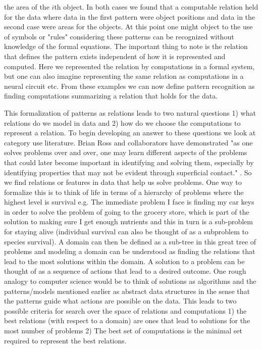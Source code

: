 \documentclass[doc]{apa}%
\begin{document}
the area of the $i$th object.  In both cases we found that a computable
relation held for the data where data in the first pattern were object
positions and data in the second case were areas for the objects.  At
this point one might object to the use of symbols or "rules"
considering these patterns can be recognized without knowledge of the
formal equations.  The important thing to note is the relation that
defines the pattern exists independent of how it is represented and
computed.  Here we represented the relation by computations in a
formal system, but one can also imagine representing the same relation
as computations in a neural circuit etc.  From these examples we can
now define pattern recognition as finding computations summarizing a relation
that holds for the data. 

This formalization of patterns as relations leads to two natural
questions 1) what relations do we model in data and 2) how do we
choose the computations to represent a relation.  To begin developing
an answer to these questions we look at category use literature.
Brian Ross and collaborators have demonstrated "as one solves problems
over and over, one may learn different aspects of the problems that
could later become important in identifying and solving them,
especially by identifying properties that may not be evident through
superficial contact." \cite{bbc}.  So we find relations or features in data that
help us solve problems.  One way to formalize this is to think of life
in terms of a hierarchy of problems where the highest level is
survival e.g. The immediate problem I face is finding my car keys in
order to solve the problem of going to the grocery store, which is
part of the solution to making sure I get enough nutrients and this in
turn is a sub-problem for staying alive (individual survival can also
be thought of as a subproblem to species survival).  A domain can then
be defined as a sub-tree in this great tree of problems and modeling a
domain can be understood as finding the relations that lead to the
most solutions within the domain.  A solution to a problem can be
thought of as a sequence of actions that lead to a desired outcome.  One rough analogy to computer
science would be to think of solutions as algorithms and the
patterns/models mentioned earlier as abstract data structures in the
sense that the patterns guide what actions are possible on the data.
This leads to two possible criteria for search over the space of
relations and computations 1) the best relations (with respect to a
domain) are ones that lead to solutions for the most number of
problems 2)  The best set of computations is the minimal set required
to represent the best relations.
\end{document}
